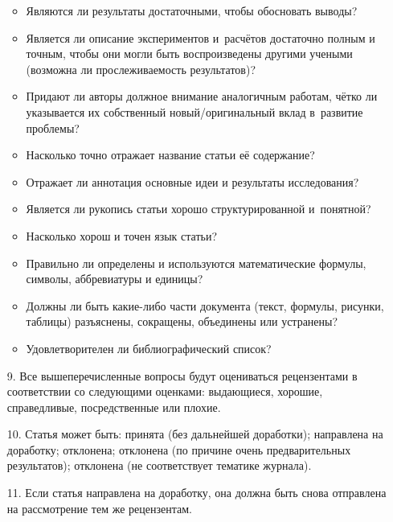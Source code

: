 \begin{enumerate}
\begin{itemize}
\item Являются ли результаты достаточными, чтобы обосновать выводы? 

\item Является ли описание экспериментов и~расчётов достаточно полным и точным, чтобы они могли быть воспроизведены другими учеными (возможна ли прослеживаемость результатов)?

\item Придают ли авторы должное внимание аналогичным работам, чётко ли указывается их собственный новый/оригинальный вклад в~развитие проблемы?

\item Насколько точно отражает название статьи её содержание?

\item Отражает ли аннотация основные идеи и результаты исследования?

\item Является ли рукопись статьи хорошо структурированной и~понятной?

\item Насколько хорош и точен язык статьи?

\item Правильно ли определены и используются математические формулы, символы, аббревиатуры и единицы?

\item Должны ли быть какие-либо части документа (текст, формулы, рисунки, таблицы) разъяснены, сокращены, объединены или устранены?

\item Удовлетворителен ли библиографический список?

\end{itemize}



\item[9.] Все вышеперечисленные вопросы будут оцениваться рецензентами в соответствии со следующими оценками: выдающиеся, хорошие, справедливые, посредственные или плохие.



\item[10.] Статья может быть: принята (без дальнейшей доработки); направлена на доработку; отклонена; отклонена (по причине очень предварительных результатов); отклонена (не соответствует тематике журнала).



\item[11.] Если статья направлена на доработку, она должна быть снова отправлена на рассмотрение тем же рецензентам.




\end{enumerate}
